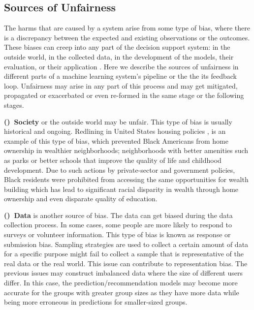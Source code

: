     \subsection{Sources of Unfairness}
        The harms that are caused by a system arise from some type of bias, where there is a discrepancy between the expected and existing observations or the outcomes. These biases can creep into any part of the decision support system: in the outside world, in the collected data, in the development of the models, their evaluation, or their application \cite{sureshframework2019}. Here we describe the sources of unfairness in different parts of a machine learning system's pipeline or the the its feedback loop. Unfairness may arise in any part of this process and may get mitigated, propagated or exacerbated or even re-formed in the same stage or the following stages.
        
        
        \textbf{()~Society} or the outside world may be unfair. This type of bias is usually historical and ongoing. Redlining in United States housing policies \cite{rothstein2017color}, is an example of this type of bias, which prevented Black Americans from home ownership in wealthier neighborhoods; neighborhoods with better amenities such as parks or better schools that improve the quality of life and childhood development. Due to such actions by private-sector and government policies, Black residents were prohibited from accessing the same opportunities for wealth building which has lead to significant racial disparity in wealth through home ownership and even disparate quality of education.
        
        \textbf{()~Data} is another source of bias. The data can get biased during the data collection process. In some cases, some people are more likely to respond to surveys or volunteer information. This type of bias is known as response or submission bias. Sampling strategies are used to collect a certain amount of data for a specific purpose might fail to collect a sample that is representative of the real data or the real world. This issue can contribute to representation bias. The previous issues may construct imbalanced data where the size of different users differ. In this case, the prediction/recommendation models may become more accurate for the groups with greater group sizes as they have more data while being more erroneous in predictions for smaller-sized groups.
        
